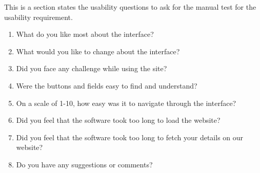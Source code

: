 \documentclass[12pt, titlepage]{article}
\begin{document}
This is a section states the usability questions to ask for the manual test for 
the usability requirement.

\begin{enumerate}
  \item What do you like most about the interface?
  \item What would you like to change about the interface?
  \item Did you face any challenge while using the site? 
  \item Were the buttons and fields easy to find and understand?
  \item On a scale of 1-10, how easy was it to navigate through the interface? 
  \item Did you feel that the software took too long to load the website?
  \item Did you feel that the software took too long to fetch your details on 
our website?
  \item Do you have any suggestions or comments?
\end{enumerate}
\end{document}
